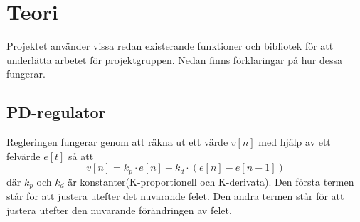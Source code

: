 \documentclass[\docdir/tech.tex]{subfiles}
\begin{document}
\section{Teori}
Projektet använder vissa redan existerande funktioner och bibliotek för att
underlätta arbetet för projektgruppen. Nedan finns förklaringar på hur dessa
fungerar.

\subsection{PD-regulator}

Regleringen fungerar genom att räkna ut ett värde $v[n]$ med hjälp av ett
felvärde $e[t]$ så att 
\begin{equation*} v[n] = k_p \cdot e[n] + k_d \cdot (e[n]-e[n-1])\end{equation*} 
där $k_p$ och $k_d$ är konstanter(K-proportionell och K-derivata). Den första
termen står för att justera utefter det nuvarande felet. Den andra termen står
för att justera utefter den nuvarande förändringen av felet.
\end{document}
